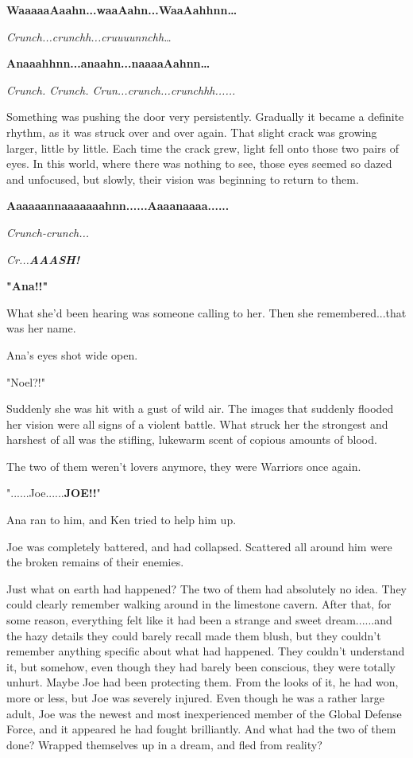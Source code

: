 \documentclass[
]{article}
\begin{document}
\textbf{WaaaaaAaahn...waaAahn...WaaAahhnn\ldots{}}

\emph{Crunch...crunchh...cruuuunnchh\ldots{}}

\textbf{Anaaahhnn...anaahn...naaaaAahnn\ldots{}}

\emph{Crunch. Crunch. Crun...crunch...crunchhh......}

Something was pushing the door very persistently. Gradually it became a
definite rhythm, as it was struck over and over again. That slight crack
was growing larger, little by little. Each time the crack grew, light
fell onto those two pairs of eyes. In this world, where there was
nothing to see, those eyes seemed so dazed and unfocused, but slowly,
their vision was beginning to return to them.

\textbf{Aaaaaannaaaaaaahnn......Aaaanaaaa......}

\emph{Crunch-crunch...}

\emph{Cr...\textbf{AAASH!}}

\emph{}\textbf{"Ana!!"}

What she'd been hearing was someone calling to her. Then she
remembered...that was her name.

Ana's eyes shot wide open.

"Noel?!"

Suddenly she was hit with a gust of wild air. The images that suddenly
flooded her vision were all signs of a violent battle. What struck her
the strongest and harshest of all was the stifling, lukewarm scent of
copious amounts of blood.

The two of them weren't lovers anymore, they were Warriors once again.

"......Joe......\textbf{JOE!!}"

Ana ran to him, and Ken tried to help him up.

Joe was completely battered, and had collapsed. Scattered all around him
were the broken remains of their enemies.

Just what on earth had happened? The two of them had absolutely no idea.
They could clearly remember walking around in the limestone cavern.
After that, for some reason, everything felt like it had been a strange
and sweet dream......and the hazy details they could barely recall made
them blush, but they couldn't remember anything specific about what had
happened. They couldn't understand it, but somehow, even though they had
barely been conscious, they were totally unhurt. Maybe Joe had been
protecting them. From the looks of it, he had won, more or less, but Joe
was severely injured. Even though he was a rather large adult, Joe was
the newest and most inexperienced member of the Global Defense Force,
and it appeared he had fought brilliantly. And what had the two of them
done? Wrapped themselves up in a dream, and fled from reality?
\end{document}
